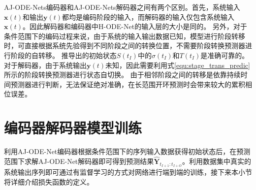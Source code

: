 

AJ-ODE-Nets编码器和AJ-ODE-Nets解码器之间有两个区别。首先，系统输入$\boldsymbol x(t)$和输出$\boldsymbol y(t)$都均是编码阶段的输入，而解码器的输入仅包含系统输入$\boldsymbol x(t)$。因此解码器和编码器中H-ODE-Net的输入层的大小是同的。
另外，对于条件范围下的编码过程来说，由于系统的输入输出数据已知，模型进行阶段转移时，可直接根据系统先验得到不同阶段之间的转换位置，不需要阶段转换预测器进行阶段的自转移。
推导出的初始状态$S(t_I)$中的$\sigma(t_I)$和$T(t_I)$是准确可靠的。
对于解码器，由于系统输出$\boldsymbol y(t)$未知，因此需要利用式\ref{equ:stage_trans_predic}所示的阶段转换预测器进行状态自切换。
由于相邻阶段之间的转移是依靠持续时间预测器进行判断，无法保证绝对准确，在长范围开环预测时会带来较大的累积相位误差。
\section{编码器解码器模型训练}
\label{sec:4_loss_function}
利用AJ-ODE-Net编码器根据条件范围下的序列输入数据获得初始状态后，在预测范围下求解AJ-ODE-Net解码器即可得到预测结果$\hat{\boldsymbol{Y}}_{t_{I+1}: t_{I+O}}$。利用数据集中真实的系统输出序列即可通过有监督学习的方式对网络进行端到端的训练，接下来本小节将详细介绍损失函数的定义。

